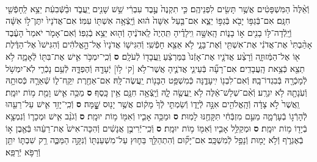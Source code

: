 \documentclass[twoside, openany, parskip=half, 11pt]{book}
\begin{document}
\begin{footnotesize}
\begin{multicols}{2}
\\
וְֿאֵ֨לֶּה֙ הַמִּשְׁפָּטִ֔ים אֲשֶׁ֥ר תָּשִׂ֖ים לִפְנֵיהֶֽם׃ כִּ֤י תִקְנֶה֙ עֶ֣בֶד עִבְרִ֔י שֵׁ֥שׁ שָׁנִ֖ים יַֽעֲבֹ֑ד וּבַ֨שְּֿׁבִעִ֔ת יֵצֵ֥א לַֽחָפְֿשִׁ֖י חִנָּֽם׃ אִם־בְּֿגַפּ֥וֹ יָבֹ֖א בְּֿגַפּ֣וֹ יֵצֵ֑א אִם־בַּ֤עַל אִשָּׁה֙ ה֔וּא וְֿיָֽצְֿאָ֥ה אִשְׁתּ֖וֹ עִמּֽוֹ׃ אִם־אֲדֹנָיו֙ יִתֶּן־ל֣וֹ אִשָּׁ֔ה וְֿיָֽלְֿדָה־לּ֥וֹ בָנִ֖ים א֣וֹ בָנ֑וֹת הָֽאִשָּׁ֣ה וִֽילָדֶ֗יהָ תִּֽהְיֶה֙ לַֽאדֹנֶ֔יהָ וְֿה֖וּא יֵצֵ֥א בְֿגַפּֽוֹ׃ וְֿאִם־אָמֹ֤ר יֹאמַר֙ הָעֶ֔בֶד אָהַ֨בְתִּי֙ אֶת־אֲדֹנִ֔י אֶת־אִשְׁתִּ֖י וְֿאֶת־בָּנָ֑י לֹ֥א אֵצֵ֖א חָפְֿשִֽׁי׃ וְֿהִגִּישׁ֤וֹ אֲדֹנָיו֙ אֶל־הָ֣אֱלֹהִ֔ים וְֿהִגִּישׁוֹ֙ אֶל־הַדֶּ֔לֶת א֖וֹ אֶל־הַמְּֿזוּזָ֑ה וְֿרָצַ֨ע אֲדֹנָ֤יו אֶת־אָזְֿנוֹ֙ בַּמַּרְצֵ֔עַ וַֽעֲבָד֖וֹ לְֿעֹלָֽם׃ \textbf{ס}  וְֿכִֽי־יִמְכֹּ֥ר אִ֛ישׁ אֶת־בִּתּ֖וֹ לְֿאָמָ֑ה לֹ֥א תֵצֵ֖א כְּֿצֵ֥את הָֽעֲבָדִֽים׃ אִם־רָעָ֞ה בְּֿעֵינֵ֧י אֲדֹנֶ֛יהָ אֲשֶׁר־לֹ֥א [ק‘ ל֥וֹ] יְֿעָדָ֖הּ וְֿהֶפְדָּ֑הּ לְֿעַ֥ם נָכְֿרִ֛י לֹֽא־יִמְשֹׁ֥ל לְֿמָכְֿרָ֖הּ בְּֿבִגְדוֹ־בָֽהּ׃ וְֿאִם־לִבְנ֖וֹ יִֽיעָדֶ֑נָּה כְּֿמִשְׁפַּ֥ט הַבָּנ֖וֹת יַֽעֲשֶׂה־לָּֽהּ׃ אִם־אַחֶ֖רֶת יִֽקַּֽח־ל֑וֹ שְֿׁאֵרָ֛הּ כְּֿסוּתָ֥הּ וְֿעֹֽנָתָ֖הּ לֹ֥א יִגְרָֽע׃ וְֿאִ֨ם־שְׁלָשׁ־אֵ֔לֶּה לֹ֥א יַֽעֲשֶׂ֖ה לָ֑הּ וְֿיָֽצְֿאָ֥ה חִנָּ֖ם אֵ֥ין כָּֽסֶף׃ \textbf{ס}  מַכֵּ֥ה אִ֛ישׁ וָמֵ֖ת מ֥וֹת יוּמָֽת׃ וַֽאֲשֶׁר֙ לֹ֣א צָדָ֔ה וְֿהָֽאֱלֹהִ֖ים אִנָּ֣ה לְֿיָד֑וֹ וְֿשַׂמְתִּ֤י לְֿךָ֙ מָק֔וֹם אֲשֶׁ֥ר יָנ֖וּס שׇׇׇׇָֽׁמָּה׃ \textbf{ס} וְֿכִֽי־יָזִ֥ד אִ֛ישׁ עַל־רֵעֵ֖הוּ לְֿהָרְֿג֣וֹ בְֿעָרְֿמָ֑ה מֵעִ֣ם מִזְבְּֿחִ֔י תִּקָּחֶ֖נּוּ לָמֽוּת׃ \textbf{ס} וּמַכֵּ֥ה אָבִ֛יו וְֿאִמּ֖וֹ מ֥וֹת יוּמָֽת׃ \textbf{ס} וְֿגֹנֵ֨ב אִ֧ישׁ וּמְכָר֛וֹ וְֿנִמְצָ֥א בְֿיָד֖וֹ מ֥וֹת יוּמָֽת׃ \textbf{ס} וּמְקַלֵּ֥ל אָבִ֛יו וְֿאִמּ֖וֹ מ֥וֹת יוּמָֽת׃ \textbf{ס} וְֿכִֽי־יְֿרִיבֻ֣ן אֲנָשִׁ֔ים וְֿהִכָּה־אִישׁ֙ אֶת־רֵעֵ֔הוּ בְּֿאֶ֖בֶן א֣וֹ בְֿאֶגְרֹ֑ף וְֿלֹ֥א יָמ֖וּת וְֿנָפַ֥ל לְֿמִשְׁכָּֽב׃ אִם־יָק֞וּם וְֿהִתְהַלֵּ֥ךְ בַּח֛וּץ עַל־מִשְׁעַנְתּ֖וֹ וְֿנִקָּ֣ה הַמַּכֶּ֑ה רַ֥ק שִׁבְתּ֛וֹ יִתֵּ֖ן וְֿרַפֹּ֥א יְֿרַפֵּֽא׃


\end{multicols}
\end{footnotesize}
\end{document}
